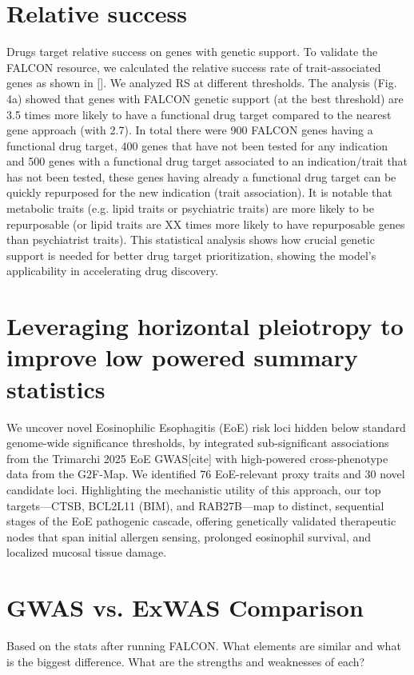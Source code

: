 \section{Relative success}
\label{sec:rs}
Drugs target relative success on genes with genetic support. To validate the FALCON resource, we calculated the relative success rate of trait-associated genes as shown in []. We analyzed RS at different thresholds. The analysis (Fig. 4a) showed that genes with FALCON genetic support (at the best threshold) are 3.5 times more likely to have a functional drug target compared to the nearest gene approach (with 2.7). In total there were 900 FALCON genes having a functional drug target, 400 genes that have not been tested for any indication and 500 genes with a functional drug target associated to an indication/trait that has not been tested, these genes having already a functional drug target can be quickly repurposed for the new indication (trait association). It is notable that metabolic traits (e.g. lipid traits or psychiatric traits) are more likely to be repurposable (or lipid traits are XX times more likely to have repurposable genes than psychiatrist traits). This statistical analysis shows how crucial genetic support is needed for better drug target prioritization, showing the model's applicability in accelerating drug discovery.
\section{Leveraging horizontal pleiotropy to improve low powered summary statistics}
\label{sec:horizontal_pleiotropy}
We uncover novel Eosinophilic Esophagitis (EoE) risk loci hidden below standard genome-wide significance thresholds, by integrated sub-significant associations from the Trimarchi 2025 EoE GWAS[cite] with high-powered cross-phenotype data from the G2F-Map. We identified 76 EoE-relevant proxy traits and 30 novel candidate loci. Highlighting the mechanistic utility of this approach, our top targets—CTSB, BCL2L11 (BIM), and RAB27B—map to distinct, sequential stages of the EoE pathogenic cascade, offering genetically validated therapeutic nodes that span initial allergen sensing, prolonged eosinophil survival, and localized mucosal tissue damage.
\section{GWAS vs. ExWAS Comparison}
\label{sec:vs}
Based on the stats after running FALCON. What elements are similar and what is the biggest difference. What are the strengths and weaknesses of each?
